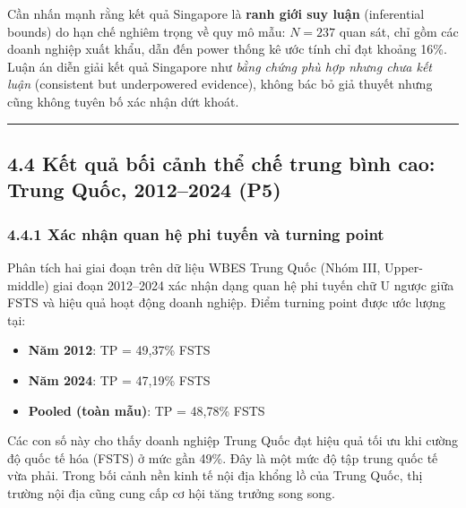 \documentclass[12pt,a4paper]{article}
\providecommand{\tightlist}{\setlength{\itemsep}{0pt}\setlength{\parskip}{0pt}}
\begin{document}
Cần nhấn mạnh rằng kết quả Singapore là \textbf{ranh giới suy luận}
(inferential bounds) do hạn chế nghiêm trọng về quy mô mẫu: \(N = 237\)
quan sát, chỉ gồm các doanh nghiệp xuất khẩu, dẫn đến power thống kê ước
tính chỉ đạt khoảng 16\%. Luận án diễn giải kết quả Singapore như
\emph{bằng chứng phù hợp nhưng chưa kết luận} (consistent but
underpowered evidence), không bác bỏ giả thuyết nhưng cũng không tuyên
bố xác nhận dứt khoát.

\begin{center}\rule{0.5\linewidth}{0.5pt}\end{center}

\hypertarget{44-kux1ebft-quux1ea3-bux1ed1i-cux1ea3nh-thux1ec3-chux1ebf-trung-buxecnh-cao-trung-quux1ed1c-20122024-p5}{%
\subsection{4.4 Kết quả bối cảnh thể chế trung bình cao: Trung Quốc,
2012--2024
(P5)}\label{44-kux1ebft-quux1ea3-bux1ed1i-cux1ea3nh-thux1ec3-chux1ebf-trung-buxecnh-cao-trung-quux1ed1c-20122024-p5}}

\hypertarget{441-xuxe1c-nhux1eadn-quan-hux1ec7-phi-tuyux1ebfn-vuxe0-turning-point}{%
\subsubsection{4.4.1 Xác nhận quan hệ phi tuyến và turning
point}\label{441-xuxe1c-nhux1eadn-quan-hux1ec7-phi-tuyux1ebfn-vuxe0-turning-point}}

Phân tích hai giai đoạn trên dữ liệu WBES Trung Quốc (Nhóm III,
Upper-middle) giai đoạn 2012--2024 xác nhận dạng quan hệ phi tuyến chữ U
ngược giữa FSTS và hiệu quả hoạt động doanh nghiệp. Điểm turning point
được ước lượng tại:

\begin{itemize}
\tightlist
\item
  \textbf{Năm 2012}: TP = 49,37\% FSTS
\item
  \textbf{Năm 2024}: TP = 47,19\% FSTS
\item
  \textbf{Pooled (toàn mẫu)}: TP = 48,78\% FSTS
\end{itemize}

Các con số này cho thấy doanh nghiệp Trung Quốc đạt hiệu quả tối ưu khi
cường độ quốc tế hóa (FSTS) ở mức gần 49\%. Đây là một mức độ tập trung
quốc tế vừa phải. Trong bối cảnh nền kinh tế nội địa khổng lồ của Trung
Quốc, thị trường nội địa cũng cung cấp cơ hội tăng trưởng song song.
\end{document}
